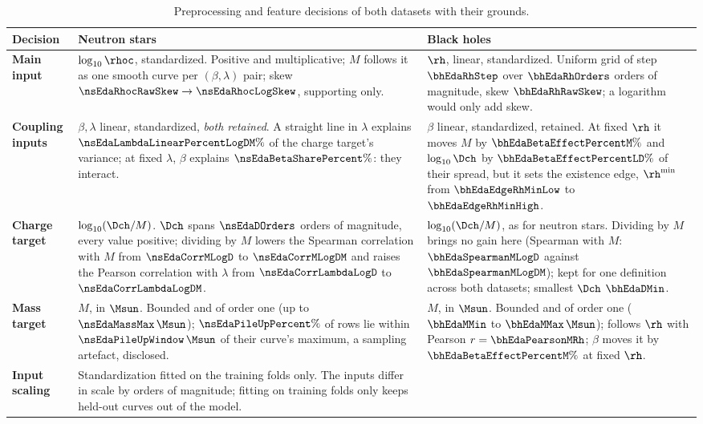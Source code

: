 \begin{table}[!htb]
\centering
\caption{Preprocessing and feature decisions of both datasets with their grounds.}
\label{tab:decisions}
\renewcommand{\arraystretch}{1.2}
\small
\begin{tabular}{p{2.6cm} p{4.5cm} p{4.5cm}}
\toprule
Decision & Neutron stars & Black holes \\
\midrule
\textbf{Main input} &
$\log_{10}\rhoc$, standardized. Positive and multiplicative; $M$ follows it as one smooth curve per $(\beta, \lambda)$ pair; skew $\nsEdaRhocRawSkew \to \nsEdaRhocLogSkew$, supporting only. &
$\rh$, linear, standardized. Uniform grid of step $\bhEdaRhStep$ over $\bhEdaRhOrders$ orders of magnitude, skew $\bhEdaRhRawSkew$; a logarithm would only add skew. \\
\textbf{Coupling inputs} &
$\beta, \lambda$ linear, standardized, \emph{both retained}. A straight line in $\lambda$ explains $\nsEdaLambdaLinearPercentLogDM\%$ of the charge target's variance; at fixed $\lambda$, $\beta$ explains $\nsEdaBetaSharePercent\%$: they interact. &
$\beta$ linear, standardized, retained. At fixed $\rh$ it moves $M$ by $\bhEdaBetaEffectPercentM\%$ and $\log_{10}\Dch$ by $\bhEdaBetaEffectPercentLD\%$ of their spread, but it sets the existence edge, $\rh^{\min}$ from $\bhEdaEdgeRhMinLow$ to $\bhEdaEdgeRhMinHigh$. \\
\textbf{Charge target} &
$\log_{10}(\Dch/M)$. $\Dch$ spans $\nsEdaDOrders$ orders of magnitude, every value positive; dividing by $M$ lowers the Spearman correlation with $M$ from $\nsEdaCorrMLogD$ to $\nsEdaCorrMLogDM$ and raises the Pearson correlation with $\lambda$ from $\nsEdaCorrLambdaLogD$ to $\nsEdaCorrLambdaLogDM$. &
$\log_{10}(\Dch/M)$, as for neutron stars. Dividing by $M$ brings no gain here (Spearman with $M$: $\bhEdaSpearmanMLogD$ against $\bhEdaSpearmanMLogDM$); kept for one definition across both datasets; smallest $\Dch$ $\bhEdaDMin$. \\
\textbf{Mass target} &
$M$, in $\Msun$. Bounded and of order one (up to $\nsEdaMassMax\,\Msun$); $\nsEdaPileUpPercent\%$ of rows lie within $\nsEdaPileUpWindow\,\Msun$ of their curve's maximum, a sampling artefact, disclosed. &
$M$, in $\Msun$. Bounded and of order one ($\bhEdaMMin$ to $\bhEdaMMax\,\Msun$); follows $\rh$ with Pearson $r = \bhEdaPearsonMRh$; $\beta$ moves it by $\bhEdaBetaEffectPercentM\%$ at fixed $\rh$. \\
\textbf{Input scaling} &
Standardization fitted on the training folds only. The inputs differ in scale by orders of magnitude; fitting on training folds only keeps held-out curves out of the model. &

\end{tabular}
\end{table}

